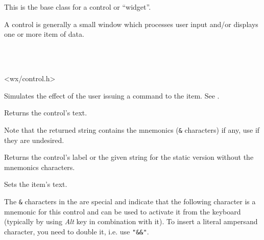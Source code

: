 \section{}\label{wxcontrol}

This is the base class for a control or ``widget''.

A control is generally a small window which processes user input and/or
displays one or more item of data.


\\
\\


<wx/control.h>





\label{wxcontrolcommand}


Simulates the effect of the user issuing a command to the item. See .


\label{wxcontrolgetlabel}


Returns the control's text.

Note that the returned string contains the mnemonics (\texttt{\&} characters) if
any, use  if they are
undesired.


\label{wxcontrolgetlabeltext}



Returns the control's label or the given  string for the static
version without the mnemonics characters.


\label{wxcontrolsetlabel}


Sets the item's text.

The \texttt{\&} characters in the  are special and indicate that the
following character is a mnemonic for this control and can be used to activate
it from the keyboard (typically by using \textit{Alt} key in combination with
it). To insert a literal ampersand character, you need to double it, i.e. use 
\texttt{"\&\&"}.


